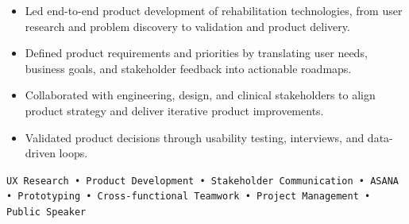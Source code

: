 \begin{itemize}
    \item Led end-to-end product development of rehabilitation technologies, from user research and problem discovery to 
    validation and product delivery.
    \vspace{+0.1em}
    \item Defined product requirements and priorities by translating user needs, business goals, and stakeholder feedback into actionable roadmaps.
    \vspace{+0.1em}
    \item Collaborated with engineering, design, and clinical stakeholders to align product strategy and deliver iterative product improvements.
    \vspace{+0.1em}
    \item Validated product decisions through usability testing, interviews, and data-driven loops.
\end{itemize}
\vspace{+0.1em}
\texttt{UX Research • Product Development • Stakeholder Communication • ASANA • Prototyping • Cross-functional Teamwork • Project Management • Public Speaker}

